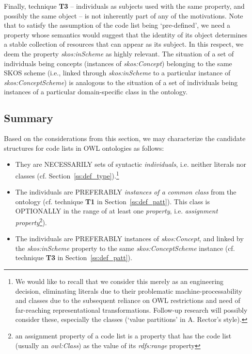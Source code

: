 Finally, technique \textbf{T3} -- individuals as subjects used with the same property, and possibly the same object -- is not inherently part of any of the motivations.
Note that to satisfy the assumption of the code list being `pre-defined', we need a property whose semantics would suggest that the identity of its object determines a stable collection of resources that can appear as its subject.
In this respect, we deem the property \emph{skos:inScheme} as highly relevant.
The situation of a set of individuals being concepts (instances of \emph{skos:Concept}) belonging to the same SKOS scheme (i.e., linked through \emph{skos:inScheme} to a particular instance of \emph{skos:ConceptScheme}) is analogous to the situation of a set of individuals being instances of a particular domain-specific class in the ontology.

\subsection{Summary}
Based on the considerations from this section, we may characterize the candidate structures for code lists in OWL ontologies as follows: 
\begin{itemize}
    \item They are NECESSARILY sets of syntactic \emph{individuals}, i.e. neither literals nor classes (cf. Section~\ref{ss:def_type}).\footnote{We would like to recall that we consider this merely as an engineering decision, eliminating literals due to their problematic machine-processability and classes due to the subsequent reliance on OWL restrictions and need of far-reaching representational transformations. Follow-up research will possibly consider these, especially the classes (`value partitions' in A. Rector's style).} 
    \item The individuals are PREFERABLY \emph{instances of a common class} from the ontology (cf. technique \textbf{T1} in Section~\ref{ss:def_patt}).
    This class is OPTIONALLY in the range of at least one \emph{property}, i.e. \textit{assignment property}\footnote{an assignment property of a code list is a property that has the code list (usually an \textit{owl:Class}) as the value of its \textit{rdfs:range} property}).
    \item The individuals are PREFERABLY instances of \emph{skos:Concept}, and linked by the \emph{skos:inScheme} property to the same \emph{skos:ConceptScheme} instance (cf. technique \textbf{T3} in Section~\ref{ss:def_patt}).
\end{itemize}

